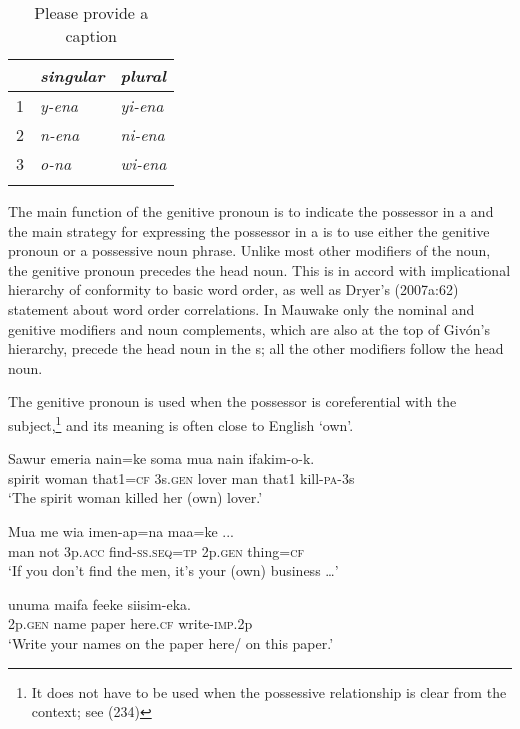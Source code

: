 \begin{table}
\caption{Please provide a caption}
 
\begin{tabular}{l>{\itshape}l>{\itshape}l}
\mytoprule
 &\upshape singular &\upshape plural\\
\midrule
1 &y-ena &yi-ena\\
2 &n-ena &ni-ena\\
3 &o-na &wi-ena\\
\mybottomrule
\end{tabular}
\end{table}


The main function of the genitive pronoun is to indicate the possessor in a  and the main strategy for expressing the possessor in a  is to use either the genitive pronoun or a possessive noun phrase. Unlike most other modifiers of the noun, the genitive pronoun precedes the head noun. This is in accord with  implicational hierarchy of conformity to basic word order, as well as Dryer's (2007a:62) statement about word order correlations. In Mauwake only the nominal and genitive modifiers and noun complements, which are also at the top of Giv\'on's \citeyear{Givon1984} hierarchy, precede the head noun in the s; all the other modifiers follow the head noun.

The genitive pronoun is used when the possessor is coreferential with the subject,\footnote{It does not have to be used when the possessive relationship is clear from the context; see (234)} and its meaning is often close to English `own'.

\ea%
\label{ex:3:x1805}
\gll Sawur emeria nain=ke  soma mua nain ifakim-o-k. \\
spirit woman that1=\textsc{cf} 3s.\textsc{gen} lover man that1 kill-\textsc{pa}-3s\\
\glt`The spirit woman killed her (own) lover.'
\z

\ea%
\label{ex:3:x1806}
\gll Mua me wia imen-ap=na  maa=ke ... \\
man not 3p.\textsc{acc} find-\textsc{ss}.\textsc{seq}=\textsc{tp} 2p.\textsc{gen} thing=\textsc{cf}\\
\glt`If you don't find the men, it's your (own) business {\dots}'
\z

\ea%
\label{ex:3:x567}
\gll {} unuma maifa feeke siisim-eka. \\
2p.\textsc{gen} name paper here.\textsc{cf} write-\textsc{imp}.2p\\
\glt`Write your names on the paper here/ on this paper.'
\z

